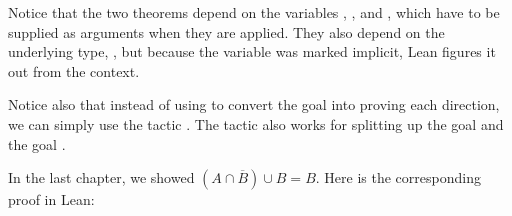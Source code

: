 \documentclass[letterpaper,10pt,english]{sphinxmanual}
\begin{document}
\sphinxAtStartPar
Notice that the two theorems depend on the variables , , and , which have to be supplied as arguments when they are applied. They also depend on the underlying type, , but because the variable  was marked implicit, Lean figures it out from the context.

\sphinxAtStartPar
Notice also that instead of using  to convert the goal
 into
proving each direction,
we can simply use the tactic .
The tactic  also works for splitting up the goal 
and the goal .

\begin{sphinxVerbatim}[commandchars=\\\{\}]
    

      
  
  


   
     
   

       
   
\end{sphinxVerbatim}

\sphinxAtStartPar
In the last chapter, we showed \((A \cap \overline B) \cup B = B\).
Here is the corresponding proof in Lean:
\end{document}
